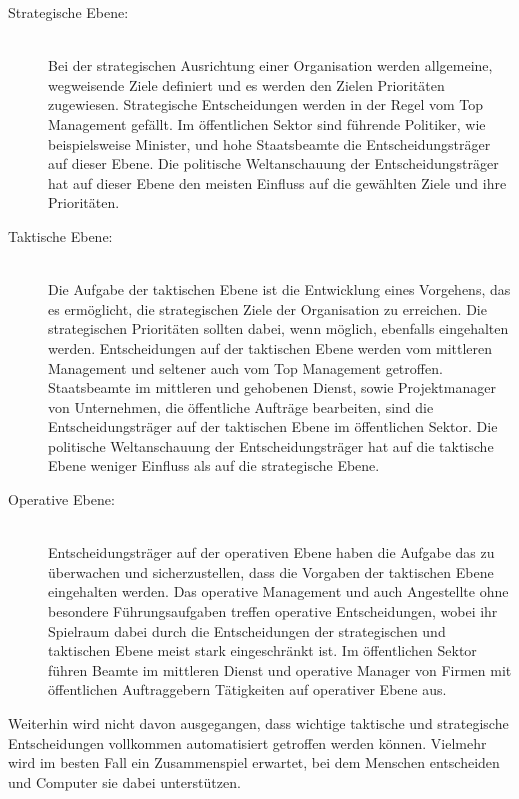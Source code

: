 \begin{description}

\item[Strategische Ebene:] \hfill \\
Bei der strategischen Ausrichtung einer Organisation werden allgemeine, wegweisende Ziele definiert
und es werden den Zielen Prioritäten zugewiesen. Strategische Entscheidungen werden in 
der Regel vom Top Management gefällt. Im öffentlichen Sektor sind führende Politiker, 
wie beispielsweise Minister, und hohe Staatsbeamte die Entscheidungsträger auf dieser Ebene.
Die politische Weltanschauung der Entscheidungsträger hat auf dieser Ebene den 
meisten Einfluss auf die gewählten Ziele und ihre Prioritäten.

\item[Taktische Ebene:] \hfill \\
Die Aufgabe der taktischen Ebene ist die Entwicklung eines Vorgehens, das es
ermöglicht, die strategischen Ziele der Organisation zu erreichen. Die strategischen
Prioritäten sollten dabei, wenn möglich, ebenfalls eingehalten werden. Entscheidungen
auf der taktischen Ebene werden vom mittleren Management und seltener auch vom Top
Management getroffen. Staatsbeamte im mittleren und gehobenen Dienst, sowie Projektmanager von
Unternehmen, die öffentliche Aufträge bearbeiten, sind die Entscheidungsträger auf der taktischen
Ebene im öffentlichen Sektor. Die politische Weltanschauung der Entscheidungsträger hat 
auf die taktische Ebene weniger Einfluss als auf die strategische Ebene. 

\item[Operative Ebene:] \hfill \\
Entscheidungsträger auf der operativen Ebene haben die Aufgabe das \grqq{}
zu überwachen und sicherzustellen, dass die Vorgaben der taktischen Ebene eingehalten werden.
Das operative Management und auch Angestellte ohne besondere Führungsaufgaben treffen operative
Entscheidungen, wobei ihr Spielraum dabei durch die Entscheidungen der strategischen und taktischen
Ebene meist stark eingeschränkt ist. Im öffentlichen Sektor führen Beamte im mittleren Dienst und 
operative Manager von Firmen mit öffentlichen Auftraggebern Tätigkeiten auf operativer Ebene aus.

\end{description}

Weiterhin wird nicht davon ausgegangen, dass wichtige taktische und strategische Entscheidungen
vollkommen automatisiert getroffen werden können. Vielmehr wird im besten Fall ein Zusammenspiel
erwartet, bei dem Menschen entscheiden und Computer sie dabei unterstützen.



